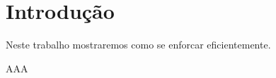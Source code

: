 \chapter{Introdução}\label{chap:intro}
Neste trabalho mostraremos como se enforcar eficientemente.

AAA
